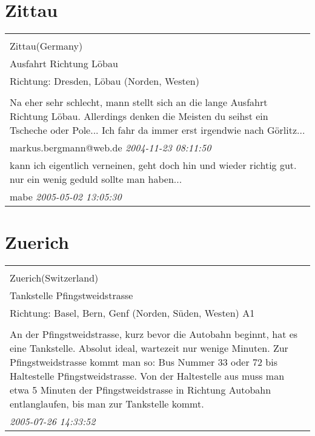\documentclass[a4paper,12pt]{article}
\begin{document}
\section{Zittau}
\begin{tabular}{|p{13cm}|}
\hline\\
Zittau(Germany)\\
Ausfahrt Richtung Löbau\\
Richtung: Dresden, Löbau (Norden, Westen) \\
\hline\\
Na eher sehr schlecht, mann stellt sich an die lange Ausfahrt Richtung Löbau. Allerdings denken die Meisten du seihst ein Tscheche oder Pole... Ich fahr da immer erst irgendwie nach Görlitz... \\
markus.bergmann@web.de \textit{ 2004-11-23 08:11:50 }\\\hline kann ich eigentlich verneinen, geht doch hin und wieder richtig gut. nur ein wenig geduld sollte man haben... \\
mabe \textit{ 2005-05-02 13:05:30 }\\\hline
\end{tabular}


\section{Zuerich}
\begin{tabular}{|p{13cm}|}
\hline\\
Zuerich(Switzerland)\\
Tankstelle Pfingstweidstrasse\\
Richtung: Basel, Bern, Genf (Norden, Süden, Westen) A1 \\
\hline\\
An der Pfingstweidstrasse, kurz bevor die Autobahn beginnt, hat es eine Tankstelle. Absolut ideal, wartezeit nur wenige Minuten. Zur Pfingstweidstrasse kommt man so: Bus Nummer 33 oder 72 bis Haltestelle Pfingstweidstrasse. Von der Haltestelle aus muss man etwa 5 Minuten der Pfingstweidstrasse in Richtung Autobahn entlanglaufen, bis man zur Tankstelle kommt. \\
\textit{ 2005-07-26 14:33:52 }\\\hline
\end{tabular}
\end{document}
